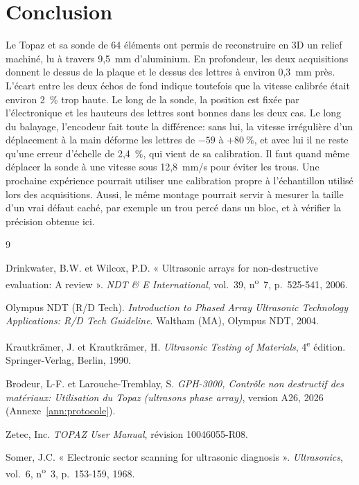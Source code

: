 \documentclass[11pt,letterpaper]{article}
\begin{document}
\section{Conclusion}
\label{sec:conclusion}

Le Topaz et sa sonde de 64 éléments ont permis de reconstruire en 3D un relief machiné, lu à travers 9,5~mm d'aluminium. En profondeur, les deux acquisitions donnent le dessus de la plaque et le dessus des lettres à environ 0,3~mm près. L'écart entre les deux échos de fond indique toutefois que la vitesse calibrée était environ 2~\% trop haute. Le long de la sonde, la position est fixée par l'électronique et les hauteurs des lettres sont bonnes dans les deux cas. Le long du balayage, l'encodeur fait toute la différence: sans lui, la vitesse irrégulière d'un déplacement à la main déforme les lettres de $-59$ à $+80~\%$, et avec lui il ne reste qu'une erreur d'échelle de 2,4~\%, qui vient de sa calibration. Il faut quand même déplacer la sonde à une vitesse sous 12,8~mm/s pour éviter les trous. Une prochaine expérience pourrait utiliser une calibration propre à l'échantillon utilisé lors des acquisitions. Aussi, le même montage pourrait servir à mesurer la taille d'un vrai défaut caché, par exemple un trou percé dans un bloc, et à vérifier la précision obtenue ici.

\renewcommand{\refname}{Bibliographie}
\begin{thebibliography}{9}

Drinkwater, B.W. et Wilcox, P.D. « Ultrasonic arrays for non-destructive evaluation: A review ». \textit{NDT \& E International}, vol.~39, n\textsuperscript{o}~7, p.~525-541, 2006.

Olympus NDT (R/D Tech). \textit{Introduction to Phased Array Ultrasonic Technology Applications: R/D Tech Guideline}. Waltham (MA), Olympus NDT, 2004.

Krautkrämer, J. et Krautkrämer, H. \textit{Ultrasonic Testing of Materials}, 4\textsuperscript{e} édition. Springer-Verlag, Berlin, 1990.

Brodeur, L-F. et Larouche-Tremblay, S. \textit{GPH-3000, Contrôle non destructif des matériaux: Utilisation du Topaz (ultrasons phase array)}, version A26, 2026 (Annexe~\ref{ann:protocole}).

Zetec, Inc. \textit{TOPAZ User Manual}, révision 10046055-R08.

Somer, J.C. « Electronic sector scanning for ultrasonic diagnosis ». \textit{Ultrasonics}, vol.~6, n\textsuperscript{o}~3, p.~153-159, 1968.

\end{thebibliography}
\end{document}
